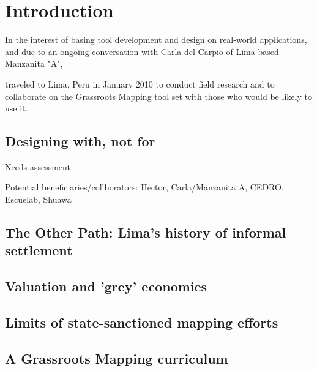 \documentclass[11pt]{report}
\begin{document}
\section{Introduction}

In the interest of basing tool development and design on real-world applications, and due to an ongoing conversation with Carla del Carpio of Lima-based Manzanita "A", 

traveled to Lima, Peru in January 2010 to conduct field research and to collaborate on the Grassroots Mapping tool set with those who would be likely to use it.

\subsection{Designing with, not for}

Needs assessment

Potential beneficiaries/collborators: Hector, Carla/Manzanita A, CEDRO, Escuelab, Shuawa

\subsection{The Other Path: Lima's history of informal settlement}


\subsection{Valuation and 'grey' economies}


\subsection{Limits of state-sanctioned mapping efforts}


\subsection{A Grassroots Mapping curriculum}

\end{document}
